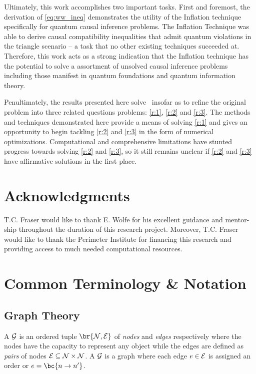 \documentclass[aps, 10pt, english, twoside, pra, nofootinbib, tightenlines, longbibliography]{revtex4-1}
\begin{document}
    Ultimately, this work accomplishes two important tasks. First and foremost, the derivation of \cref{eq:ww_ineq} demonstrates the utility of the Inflation technique specifically for quantum causal inference problems. The Inflation Technique was able to derive causal compatibility inequalities that admit quantum violations in the triangle scenario -- a task that no other existing techniques succeeded at. Therefore, this work acts as a strong indication that the Inflation technique has the potential to solve a assortment of unsolved causal inference problems including those manifest in quantum foundations and quantum information theory.

    Penultimately, the results presented here solve~\cite[Problem 2.17]{Fritz_2012} insofar as to refine the original problem into three related questions problems: \ref{r:1}, \ref{r:2} and \ref{r:3}. The methods and techniques demonstrated here provide a means of solving \ref{r:1} and gives an opportunity to begin tackling \ref{r:2} and \ref{r:3} in the form of numerical optimizations. Computational and comprehensive limitations have stunted progress towards solving \ref{r:2} and \ref{r:3}, so it still remains unclear if \ref{r:2} and \ref{r:3} have affirmative solutions in the first place.

    \section*{Acknowledgments}
    T.C. Fraser would like to thank E. Wolfe for his excellent guidance and mentor-ship throughout the duration of this research project. Moreover, T.C. Fraser would like to thank the Perimeter Institute for financing this research and providing access to much needed computational resources.
    \clearpage
    

    \clearpage
    \appendix


    \section{Common Terminology \& Notation}

    \subsection{Graph Theory}
    \label{sec:graph_theory}
    \begin{definition}
        \label{def:graph}
        A  $\mathcal{G}$ is an ordered tuple $\br{\nodes, \edges}$ of \textit{nodes} and \textit{edges} respectively where the nodes have the capacity to represent any object while the edges are defined as \textit{pairs} of nodes $\mathcal{E} \subseteq \mathcal{N} \times \mathcal{N}$. A  $\mathcal{G}$ is a graph where each edge $e \in \mathcal{E}$ is assigned an order or  $e = \bc{n \to n'}$.
    \end{definition}
\end{document}
